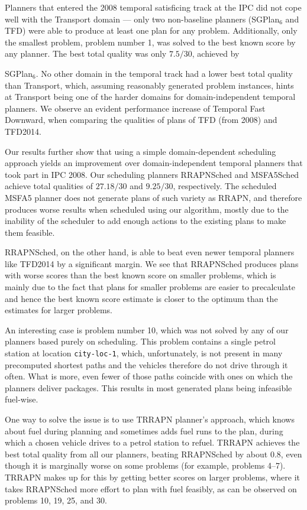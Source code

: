 Planners that entered the 2008 temporal satisficing track at the IPC did not cope well with the Transport domain
--- only two non-baseline planners (SGPlan$_6$ and TFD) were able to produce at least one plan
for any problem. Additionally, only the smallest problem, problem number 1, was solved
to the best known score by any planner.
The best total quality was only $7.5/30$, achieved by
{SGPlan$_6$. No other domain in the temporal track had a lower best total quality
than Transport, which, assuming reasonably generated problem instances, hints
at Transport being one of the harder domains for domain-independent temporal planners.
We observe an evident performance increase of Temporal Fast Downward,
when comparing the qualities of plans of TFD (from 2008) and TFD2014.

Our results further show that using a simple domain-dependent scheduling approach
yields an improvement over domain-independent temporal planners
that took part in IPC 2008. Our scheduling planners RRAPNSched
and MSFA5Sched achieve total qualities of $27.18/30$
and $9.25/30$, respectively.
The scheduled MSFA5 planner does not generate plans of such variety as RRAPN,
and therefore produces worse results when scheduled using our algorithm,
mostly due to the inability of the scheduler to add enough 
actions to the existing plans to make them feasible.

RRAPNSched, on the other hand, is able to beat even newer temporal planners like TFD2014
by a significant margin.
We see that RRAPNSched produces plans with worse scores than the best known score on smaller problems, which is mainly due to the fact that plans for smaller problems are easier to precalculate and hence the best known score estimate is closer
to the optimum than the estimates for larger problems.

An interesting case is problem number 10,
which was not solved by any of our planners based purely on scheduling.
This problem contains a single petrol station at location \texttt{city-loc-1},
which, unfortunately, is not present in many precomputed shortest
paths and the vehicles therefore do not drive through it often.
What is more, even fewer of those paths coincide with ones
on which the planners deliver packages.
This results in most generated plans being infeasible fuel-wise.

One way to solve the issue is to use TRRAPN planner's approach,
which knows about fuel during planning and 
sometimes adds fuel runs to the plan, during which a chosen vehicle
drives to a petrol station to refuel.
TRRAPN achieves the best total quality from all our planners,
beating RRAPNSched by about $0.8$,
even though it is marginally worse on some problems (for example, problems 4--7). TRRAPN makes up for this by getting better scores on
larger problems, where it takes RRAPNSched more effort to plan with fuel feasibly,
as can be observed on problems 10, 19, 25, and 30.

}
